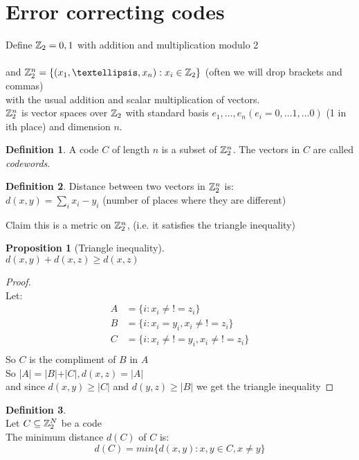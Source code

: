 \documentclass[]{article}
\newtheorem{prop}[thm]{Proposition}
\theoremstyle{definition}
\newtheorem*{defn}{Definition}
\theoremstyle{remark}
\numberwithin{equation}{section}
\begin{document}
\newpage
\section{Error correcting codes}
	Define $\mathbb{Z}_2 = {0,1}$ with addition and multiplication modulo 2\\
	\\
	and $\ZZb^n = \{(x_1,…, x_n): x_i \in \ZZb\}$ (often we will drop brackets and commas)\\ with the usual addition and scalar multiplication of vectors.\\
	$\mathbb{Z}_2^n$ is vector spaces over $\mathbb{Z}_2$ with standard basis $e_1, …,e_n (e_i = 0,…1,…0)$ (1 in ith place) and dimension $n$.

	\begin{defn}
		 A code $C$ of length $n$ is a subset of $\mathbb{Z}_2^n$. The vectors in $C$ are called \emph{codewords}.
	\end{defn}
	\begin{defn}
		Distance between two vectors in $\mathbb{Z}_2^n$ is:\\
		$d(x,y) = \sum_i x_i - y_i$ (number of places where they are different)

	\end{defn}
	Claim this is a metric on $\mathbb{Z}_2^n$, (i.e. it satisfies the triangle inequality)
	\begin{prop}[Triangle inequality]\hfill\\
	$d(x,y) + d(x,z) \geq d(x,z)$
	\end{prop}
	\begin{proof}\hfill \\
	Let:\\
	\begin{align*}
		A &= \{i: x_i \neq{!=}z_i\}\\
		B &= \{i: x_i = y_i, x_i \neq{!=} z_i\}	\\
		C &= \{i: x_i \neq{!=} y_i, x_i \neq{!=} z_i\}\\
	\end{align*}
	So $C$ is the compliment of $B$ in $A$\\
	So |$A| = |B| + |C|, d(x,z) = |A|$\\
	and since $d(x,y) \geq |C|$ and $d(y,z) \geq|B|$ we get the triangle inequality
	\end{proof}

	\begin{defn}\hfill\\
	Let $C \subseteq \mathbb{Z}_2^N$ be a code\\
	The minimum distance $d(C)$ of $C$ is:\\
	\[
		d(C) = min \{ d(x,y): x,y \in C, x \neq y\}
	\]
	\end{defn}
\end{document}
